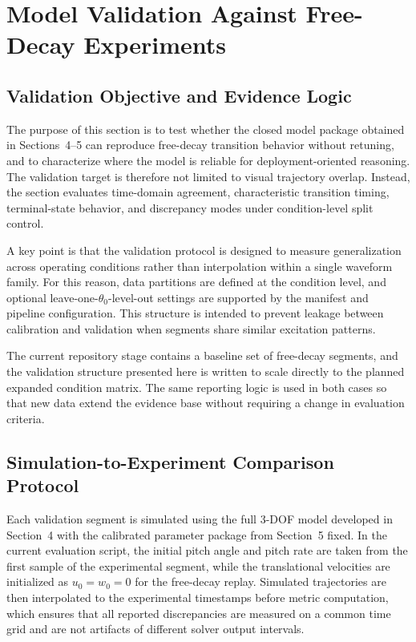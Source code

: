 \section{Model Validation Against Free-Decay Experiments}

\subsection{Validation Objective and Evidence Logic}

The purpose of this section is to test whether the closed model package obtained in Sections~4--5 can reproduce free-decay transition behavior without retuning, and to characterize where the model is reliable for deployment-oriented reasoning. The validation target is therefore not limited to visual trajectory overlap. Instead, the section evaluates time-domain agreement, characteristic transition timing, terminal-state behavior, and discrepancy modes under condition-level split control.

A key point is that the validation protocol is designed to measure generalization across operating conditions rather than interpolation within a single waveform family. For this reason, data partitions are defined at the condition level, and optional leave-one-$\theta_0$-level-out settings are supported by the manifest and pipeline configuration. This structure is intended to prevent leakage between calibration and validation when segments share similar excitation patterns.

The current repository stage contains a baseline set of free-decay segments, and the validation structure presented here is written to scale directly to the planned expanded condition matrix. The same reporting logic is used in both cases so that new data extend the evidence base without requiring a change in evaluation criteria.


\subsection{Simulation-to-Experiment Comparison Protocol}

Each validation segment is simulated using the full 3-DOF model developed in Section~4 with the calibrated parameter package from Section~5 fixed. In the current evaluation script, the initial pitch angle and pitch rate are taken from the first sample of the experimental segment, while the translational velocities are initialized as $u_0=w_0=0$ for the free-decay replay. Simulated trajectories are then interpolated to the experimental timestamps before metric computation, which ensures that all reported discrepancies are measured on a common time grid and are not artifacts of different solver output intervals.

